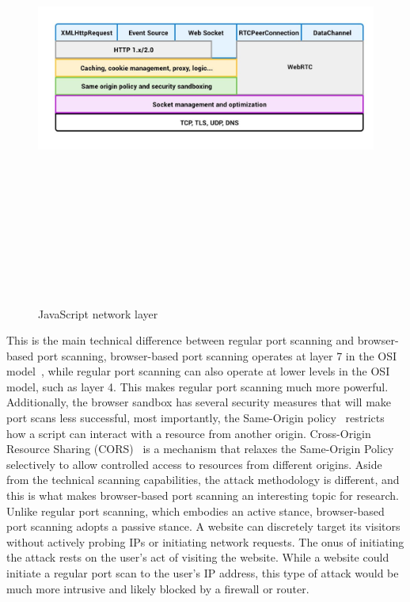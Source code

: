 \begin{figure}[h]
    \centering
    \includegraphics[width=15cm, height=15cm, keepaspectratio]{background/img/js_network_stack.jpg}
    \caption{JavaScript network layer}
    \label{fig:js-network-stack}
\end{figure}

This is the main technical difference between regular port scanning and browser-based port scanning, browser-based port scanning operates at layer 7 in the OSI model~, while regular port scanning can also operate at lower levels in the OSI model, such as layer 4. 
This makes regular port scanning much more powerful.
Additionally, the browser sandbox has several security measures that will make port scans less successful, most importantly, the Same-Origin policy~ restricts how a script can interact with a resource from another origin. 
Cross-Origin Resource Sharing (CORS)~ is a mechanism that relaxes the Same-Origin Policy selectively to allow controlled access to resources from different origins. 
Aside from the technical scanning capabilities, the attack methodology is different, and this is what makes browser-based port scanning an interesting topic for research. 
Unlike regular port scanning, which embodies an active stance, browser-based port scanning adopts a passive stance. 
A website can discretely target its visitors without actively probing IPs or initiating network requests. The onus of initiating the attack rests on the user's act of visiting the website. 
While a website could initiate a regular port scan to the user's IP address, this type of attack would be much more intrusive and likely blocked by a firewall or router.


